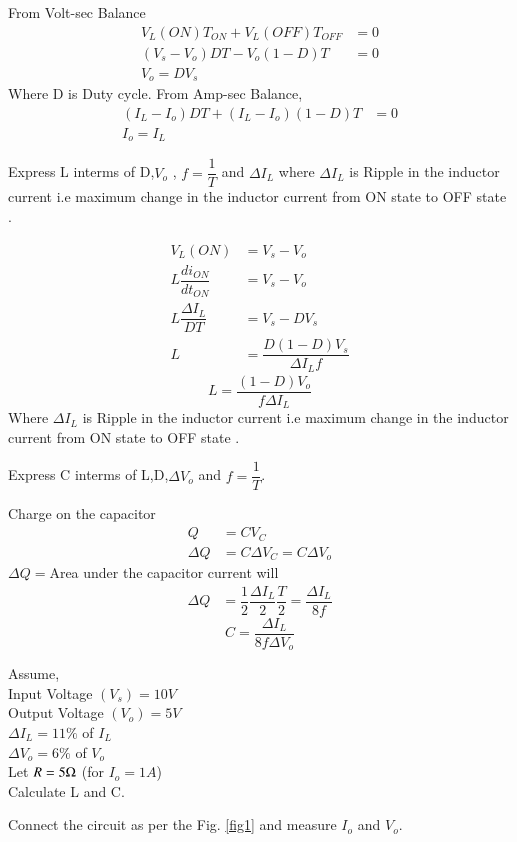 \documentclass[journal,12pt,twocolumn]{IEEEtran}
\begin{document}
\solution
From Volt-sec Balance
 \begin{align*}
  V_{L}(ON)T_{ON} + V_{L}(OFF)T_{OFF}&= 0 \\
  (V_{s} - V_{o})D T-V_{o}(1-D)T &= 0 \\
  V_{o} = DV_{s}
\end{align*} 
Where D is Duty cycle.
From Amp-sec Balance,
\begin{align*}
  (I_{L} - I_{o})D T+(I_{L}-I_{o})(1-D)T &= 0 \\
  I_{o} = I_{L}
\end{align*} 
\begin{problem}
Express L interms of D,$V_{o}$ , $f=\dfrac{1}{T}$ and $\Delta I_{L}$ where $\Delta I_{L}$ is Ripple in the inductor  current i.e maximum change in the inductor current from ON state to OFF state . 
\end{problem}
\solution
\begin{align*}
  V_{L}(ON) &= V_{s} - V_{o}\\
  L \dfrac{di_{ON}}{dt_{ON}} &=V_{s} - V_{o}\\
  L \dfrac{\Delta I_{L}}{DT} &=V_{s} - DV_{s}\\
  L &=\dfrac{D(1-D)V_{s}}{\Delta I_{L}f}
  \end{align*}
\begin{equation}
\label{eq:eq1}
L=\dfrac{(1-D)V_{o}}{f\Delta I_{L}}
\end{equation}
Where $\Delta I_{L}$ is Ripple in the inductor  current i.e maximum change in the inductor current from ON state to OFF state . 
\begin{problem}
Express C interms of L,D,$\Delta V_{o}$ and $f=\dfrac{1}{T}$.
\end{problem}
\solution
Charge on the capacitor 
\begin{align*}
  Q&=CV_{C}\\
  \Delta Q &= C\Delta V_{C} =C\Delta V_{o}
\end{align*}
$\Delta Q=$Area under the capacitor current will
\begin{align*}
 \Delta Q &= \dfrac{1}{2}  \dfrac{\Delta I_{L}}{2} \dfrac{T}{2} =  \dfrac{\Delta I_{L}}{8f}
\end{align*}
\begin{equation}
\label{eq:eq2}
C=\dfrac{\Delta I_{L}}{8f\Delta V_{o}}  
\end{equation}
\begin{problem}
Assume,\\
Input Voltage $(V_{s}) = 10V$\\
Output Voltage $(V_{o}) = 5V$\\
$\Delta I_{L} = 11 \% $ of $I_{L}$\\
$\Delta V_{o} = 6 \% $ of $V_{o}$ \\
Let $R = 5 \ohm $ (for $I_{o}=1A$)\\
Calculate L and C.
\end{problem} 
\begin{problem}
Connect the circuit as per the Fig. \ref{fig1} and measure $I_{o}$ and $V_{o}$.
\end{problem}
\end{document}
